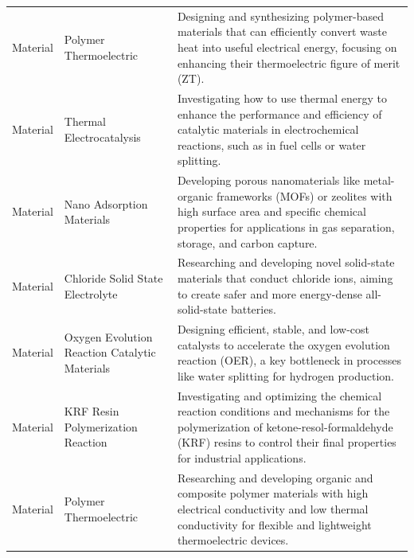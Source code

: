 \begin{longtable}{p{2cm}p{6cm}p{7cm}}
\rowcolor{MaterialColor} Material & Polymer Thermoelectric & Designing and synthesizing polymer-based materials that can efficiently convert waste heat into useful electrical energy, focusing on enhancing their thermoelectric figure of merit (ZT). \\
\rowcolor{MaterialColor} Material & Thermal Electrocatalysis & Investigating how to use thermal energy to enhance the performance and efficiency of catalytic materials in electrochemical reactions, such as in fuel cells or water splitting. \\
\rowcolor{MaterialColor} Material & Nano Adsorption Materials & Developing porous nanomaterials like metal-organic frameworks (MOFs) or zeolites with high surface area and specific chemical properties for applications in gas separation, storage, and carbon capture. \\
\rowcolor{MaterialColor} Material & Chloride Solid State Electrolyte & Researching and developing novel solid-state materials that conduct chloride ions, aiming to create safer and more energy-dense all-solid-state batteries. \\
\rowcolor{MaterialColor} Material & Oxygen Evolution Reaction Catalytic Materials & Designing efficient, stable, and low-cost catalysts to accelerate the oxygen evolution reaction (OER), a key bottleneck in processes like water splitting for hydrogen production. \\
\rowcolor{MaterialColor} Material & KRF Resin Polymerization Reaction & Investigating and optimizing the chemical reaction conditions and mechanisms for the polymerization of ketone-resol-formaldehyde (KRF) resins to control their final properties for industrial applications. \\
\rowcolor{MaterialColor} Material & Polymer Thermoelectric & Researching and developing organic and composite polymer materials with high electrical conductivity and low thermal conductivity for flexible and lightweight thermoelectric devices. \\


\end{longtable}
